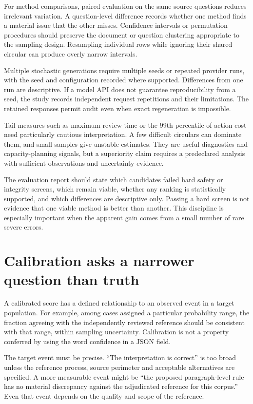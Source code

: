 \documentclass[12pt,a4paper,oneside,openany]{book}
\begin{document}
For method comparisons, paired evaluation on the same source questions reduces
irrelevant variation. A question-level difference records whether one method
finds a material issue that the other misses. Confidence intervals or permutation
procedures should preserve the document or question clustering appropriate to the
sampling design. Resampling individual rows while ignoring their shared circular
can produce overly narrow intervals.

Multiple stochastic generations require multiple seeds or repeated provider runs,
with the seed and configuration recorded where supported. Differences from one
run are descriptive. If a model API does not guarantee reproducibility from a
seed, the study records independent request repetitions and their limitations.
The retained responses permit audit even when exact regeneration is impossible.

Tail measures such as maximum review time or the 99th percentile of action cost
need particularly cautious interpretation. A few difficult circulars can dominate
them, and small samples give unstable estimates. They are useful diagnostics and
capacity-planning signals, but a superiority claim requires a predeclared analysis
with sufficient observations and uncertainty evidence.

The evaluation report should state which candidates failed hard safety or
integrity screens, which remain viable, whether any ranking is statistically
supported, and which differences are descriptive only. Passing a hard screen is
not evidence that one viable method is better than another. This discipline is
especially important when the apparent gain comes from a small number of rare
severe errors.

\section{Calibration asks a narrower question than truth}

A calibrated score has a defined relationship to an observed event in a target
population. For example, among cases assigned a particular probability range,
the fraction agreeing with the independently reviewed reference should be
consistent with that range, within sampling uncertainty. Calibration is not a
property conferred by using the word confidence in a JSON field.

The target event must be precise. ``The interpretation is correct'' is too broad
unless the reference process, source perimeter and acceptable alternatives are
specified. A more measurable event might be ``the proposed paragraph-level rule
has no material discrepancy against the adjudicated reference for this corpus.''
Even that event depends on the quality and scope of the reference.
\end{document}
